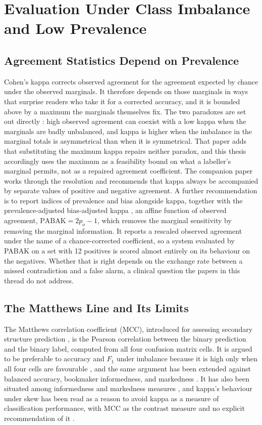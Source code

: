 \section{Evaluation Under Class Imbalance and Low Prevalence}
\label{sec:lit-metrics}

\subsection{Agreement Statistics Depend on Prevalence}

Cohen's kappa \citep{cohen1960kappa} corrects observed agreement for the agreement expected by
chance under the observed marginals. It therefore depends on those marginals in ways that surprise
readers who take it for a corrected accuracy, and it is bounded above by a maximum the marginals
themselves fix. The two paradoxes are set out directly \citep{feinstein1990paradoxes}: high observed agreement can
coexist with a low kappa when the marginals are badly unbalanced, and kappa is higher when the
imbalance in the marginal totals is asymmetrical than when it is symmetrical. That paper adds that
substituting the maximum kappa repairs neither paradox, and this thesis accordingly uses the maximum
as a feasibility bound on what a labeller's marginal permits, not as a repaired agreement
coefficient. The companion paper \citep{cicchetti1990resolving} works through the resolution and
recommends that kappa always be accompanied by separate values of positive and negative agreement.
A further recommendation is to report indices of prevalence and bias alongside kappa, together
with the prevalence-adjusted bias-adjusted
kappa \citep{byrt1993pabak}, an affine function of observed agreement, $\mathrm{PABAK} = 2p_o - 1$, which removes the
marginal sensitivity by removing the marginal information. It reports a rescaled observed agreement
under the name of a chance-corrected coefficient, so a system evaluated by PABAK on a set with 12 positives is scored almost entirely on its behaviour on the negatives. Whether that is right depends
on the exchange rate between a missed contradiction and a false alarm, a clinical question the papers
in this thread do not address.

\subsection{The Matthews Line and Its Limits}

The Matthews correlation coefficient (MCC), introduced for assessing secondary structure prediction
\citep{matthews1975mcc}, is the Pearson correlation between the binary prediction and the binary
label, computed from all four confusion matrix cells. It is argued to be
preferable to accuracy and $F_1$ under imbalance because it is high only when all four cells are
favourable \citep{chicco2020mcc}, and the same argument has been extended against balanced accuracy,
bookmaker informedness, and markedness \citep{chicco2021mccbalanced}. It has also been situated among informedness
and markedness measures \citep{powers2011evaluation}, and kappa's behaviour under skew has been read
as a reason to avoid kappa as a measure of classification performance, with MCC as the contrast
measure and no explicit recommendation of it \citep{delgado2019kappa}.

